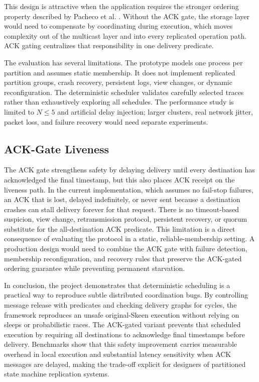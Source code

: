 \documentclass[conference]{IEEEtran}
\begin{document}
This design is attractive when the application requires the stronger ordering property described by Pacheco et al. \cite{pacheco}. Without the ACK gate, the storage layer would need to compensate by coordinating during execution, which moves complexity out of the multicast layer and into every replicated operation path. ACK gating centralizes that responsibility in one delivery predicate.

The evaluation has several limitations. The prototype models one process per partition and assumes static membership. It does not implement replicated partition groups, crash recovery, persistent logs, view changes, or dynamic reconfiguration. The deterministic scheduler validates carefully selected traces rather than exhaustively exploring all schedules. The performance study is limited to $N \leq 5$ and artificial delay injection; larger clusters, real network jitter, packet loss, and failure recovery would need separate experiments.

\subsection{ACK-Gate Liveness}

The ACK gate strengthens safety by delaying delivery until every destination has acknowledged the final timestamp, but this also places ACK receipt on the liveness path. In the current implementation, which assumes no fail-stop failures, an ACK that is lost, delayed indefinitely, or never sent because a destination crashes can stall delivery forever for that request. There is no timeout-based suspicion, view change, retransmission protocol, persistent recovery, or quorum substitute for the all-destination ACK predicate. This limitation is a direct consequence of evaluating the protocol in a static, reliable-membership setting. A production design would need to combine the ACK gate with failure detection, membership reconfiguration, and recovery rules that preserve the ACK-gated ordering guarantee while preventing permanent starvation.

In conclusion, the project demonstrates that deterministic scheduling is a practical way to reproduce subtle distributed coordination bugs. By controlling message release with predicates and checking delivery graphs for cycles, the framework reproduces an unsafe original-Skeen execution without relying on sleeps or probabilistic races. The ACK-gated variant prevents that scheduled execution by requiring all destinations to acknowledge final timestamps before delivery. Benchmarks show that this safety improvement carries measurable overhead in local execution and substantial latency sensitivity when ACK messages are delayed, making the trade-off explicit for designers of partitioned state machine replication systems.


\end{document}
